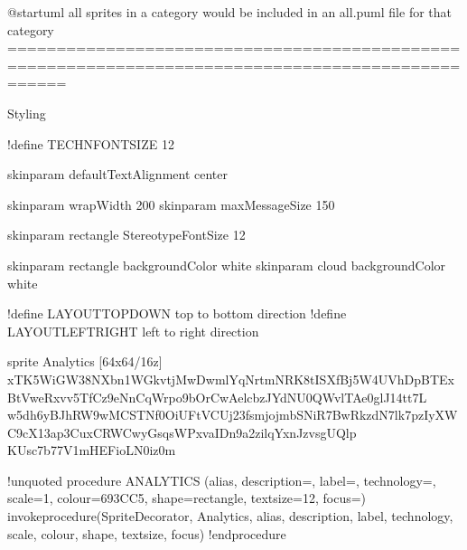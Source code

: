 \documentclass[letterpaper,10pt,english]{sphinxmanual}
\begin{document}
%
\begin{sphinxVerbatim}[commandchars=\\\{\},numbers=left,firstnumber=1,stepnumber=1]
@startuml
\PYGZsq{}all sprites in a category would be included in an all.puml file for that category
\PYGZsq{}==================================================================================================


\PYGZsq{} Styling
\PYGZsq{} \PYGZsh{}\PYGZsh{}\PYGZsh{}\PYGZsh{}\PYGZsh{}\PYGZsh{}\PYGZsh{}\PYGZsh{}\PYGZsh{}\PYGZsh{}\PYGZsh{}\PYGZsh{}\PYGZsh{}\PYGZsh{}\PYGZsh{}\PYGZsh{}\PYGZsh{}\PYGZsh{}\PYGZsh{}\PYGZsh{}\PYGZsh{}\PYGZsh{}\PYGZsh{}\PYGZsh{}\PYGZsh{}\PYGZsh{}\PYGZsh{}\PYGZsh{}\PYGZsh{}\PYGZsh{}\PYGZsh{}\PYGZsh{}\PYGZsh{}\PYGZsh{}

!define TECHN\PYGZus{}FONT\PYGZus{}SIZE 12

skinparam defaultTextAlignment center

skinparam wrapWidth 200
skinparam maxMessageSize 150

skinparam rectangle \PYGZob{}
    StereotypeFontSize 12
\PYGZcb{}


skinparam rectangle \PYGZob{}
backgroundColor white
\PYGZcb{}
skinparam cloud \PYGZob{}
backgroundColor white
\PYGZcb{}


!define LAYOUT\PYGZus{}TOP\PYGZus{}DOWN top to bottom direction
!define LAYOUT\PYGZus{}LEFT\PYGZus{}RIGHT left to right direction



sprite \PYGZdl{}Analytics [64x64/16z] \PYGZob{}
xTK5WiGW38NXbn1WGkv\PYGZus{}tjMwDwml\PYGZus{}\PYGZus{}YqNrtmNRK8tISXfBj5W4UVhDpBTExBtVweRxvv5TfCz9eNnCqWrpo9bOrCwAelc\PYGZus{}bzJYdNU0QWvlTAe0glJ14\PYGZhy{}tt7L
w5d\PYGZus{}h6yBJ\PYGZhy{}hR\PYGZus{}W9wMCSTNf0OiUFtVCUj23f\PYGZhy{}smjojmbSNiR\PYGZus{}7BwRkz\PYGZhy{}dN7l\PYGZhy{}k7pz\PYGZhy{}IyXWC9cX13ap3CuxCRWCwyGsqsWPxvaIDn9a2zilqYxnJzv\PYGZus{}sg\PYGZhy{}UQlp
KU\PYGZus{}sc7b77\PYGZhy{}V1mHEFioLN\PYGZhy{}0iz0m
\PYGZcb{}

!unquoted procedure \PYGZdl{}ANALYTICS (\PYGZdl{}alias, \PYGZdl{}description=\PYGZdq{}\PYGZdq{}, \PYGZdl{}label=\PYGZdq{}\PYGZdq{}, \PYGZdl{}technology=\PYGZdq{}\PYGZdq{}, \PYGZdl{}scale=1, \PYGZdl{}colour=\PYGZdq{}693CC5\PYGZdq{}, \PYGZdl{}shape=\PYGZdq{}rectangle\PYGZdq{}, \PYGZdl{}textsize=\PYGZdq{}12\PYGZdq{}, \PYGZdl{}focus=\PYGZdq{}\PYGZdq{})
\PYGZpc{}invoke\PYGZus{}procedure(\PYGZdl{}SpriteDecorator, \PYGZdq{}\PYGZdl{}Analytics\PYGZdq{}, \PYGZdl{}alias, \PYGZdl{}description, \PYGZdl{}label, \PYGZdl{}technology, \PYGZdl{}scale, \PYGZdl{}colour, \PYGZdl{}shape, \PYGZdl{}textsize, \PYGZdl{}focus)
!endprocedure



\end{sphinxVerbatim}
\end{document}
